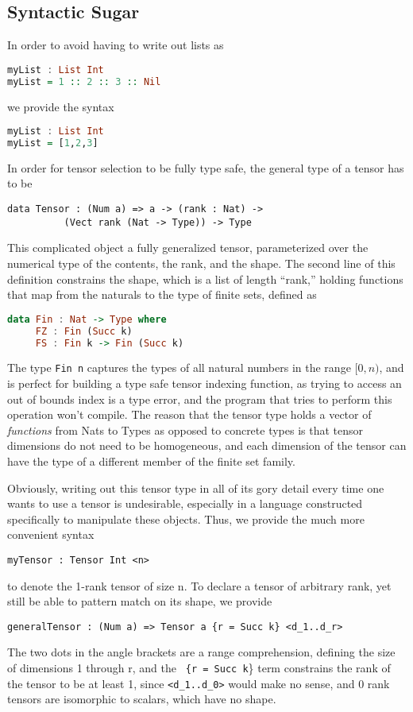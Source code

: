 \documentclass[12pt]{article}
\begin{document}
\subsection{Syntactic Sugar}
In order to avoid having to write out lists as 
\begin{lstlisting}[language=Haskell]
myList : List Int
myList = 1 :: 2 :: 3 :: Nil
\end{lstlisting}
we provide the syntax 
\begin{lstlisting}[language=Haskell]
myList : List Int
myList = [1,2,3]
\end{lstlisting}
In order for tensor selection to be fully type safe, the general type of a tensor has to be
\begin{lstlisting}
data Tensor : (Num a) => a -> (rank : Nat) -> 
	      (Vect rank (Nat -> Type)) -> Type
\end{lstlisting}
This complicated object a fully generalized tensor, parameterized over the numerical type of the contents, the rank, and the shape. The second line of this definition constrains the shape, which is a list of length ``rank,'' holding functions that map from the naturals to the type of finite sets, defined as 
\begin{lstlisting}[language=Haskell]
data Fin : Nat -> Type where
     FZ : Fin (Succ k)
     FS : Fin k -> Fin (Succ k)
\end{lstlisting}
The type \lstinline{Fin n}
captures the types of all natural numbers in the range $[0,n)$, and is perfect for building a type safe tensor indexing function, as trying to access an out of bounds index is a type error, and the program that tries to perform this operation won't compile. The reason that the tensor type holds a vector of \textit{functions} from Nats to Types as opposed to concrete types is that tensor dimensions do not need to be homogeneous, and each dimension of the tensor can have the type of a different member of the finite set family. 

Obviously, writing out this tensor type in all of its gory detail every time one wants to use a tensor is undesirable, especially in a language constructed specifically to manipulate these objects. Thus, we provide the much more convenient syntax 
\begin{lstlisting}
myTensor : Tensor Int <n>
\end{lstlisting}
to denote the 1-rank tensor of size n. To declare a tensor of arbitrary rank, yet still be able to pattern match on its shape, we provide
\begin{lstlisting}
generalTensor : (Num a) => Tensor a {r = Succ k} <d_1..d_r>
\end{lstlisting}
The two dots in the angle brackets are a range comprehension, defining the size of dimensions 1 through r, and the \lstinline{ {r = Succ k}\} term constrains the rank of the tensor to be at least 1, since 
\lstinline{<d_1..d_0>} would make no sense, and 0 rank tensors are isomorphic to scalars, which have no shape.
\end{document}
